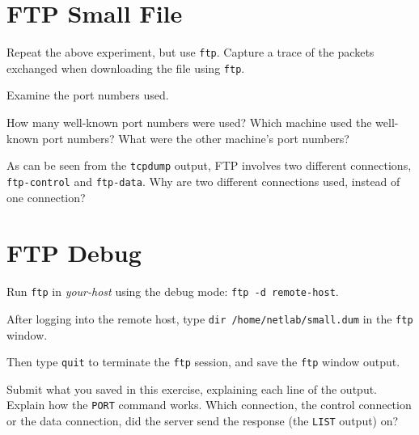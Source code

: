 \documentclass{../UTNetLab}
\begin{document}
\section{FTP Small File}
    Repeat the above experiment, but use \lstinline{ftp}.
    Capture a trace of the packets exchanged when downloading the  file using \lstinline{ftp}.

    Examine the port numbers used.
    
    \begin{report}
        \item How many well-known port numbers were used?
        Which machine used the well-known port numbers?
        What were the other machine’s port numbers?
        
        \item As can be seen from the \lstinline{tcpdump} output, FTP involves two different connections, \texttt{ftp-control} and \texttt{ftp-data}.
        Why are two different connections used, instead of one connection?
    \end{report}

\section{FTP Debug}
    Run \lstinline{ftp} in \textit{your-host} using the debug mode: \lstinline[emph={your-host, remote-host}]{ftp -d remote-host}.

    After logging into the remote host, type \lstinline{dir /home/netlab/small.dum} in the \lstinline{ftp} window.

    Then type \lstinline{quit} to terminate the \lstinline{ftp} session, and save the \lstinline{ftp} window output.
    
    \begin{report}
    \item Submit what you saved in this exercise, explaining each line of the output.
    Explain how the \lstinline{PORT} command works.
    Which connection, the control connection or the data connection, did the server send the response (the \lstinline{LIST} output) on?
    \end{report}
\end{document}
